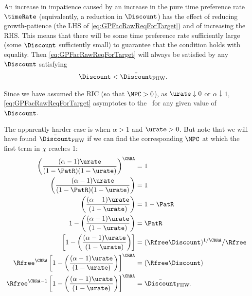 \documentclass{handout}
\begin{document}
An increase in impatience caused by an increase in the pure time preference rate $\timeRate$ (equivalently, a reduction in $\Discount$) has the effect of reducing growth-patience (the LHS of \eqref{eq:GPFacRawReqForTarget}) and of increasing the RHS.  This means that there will be some time preference rate sufficiently large (some $\Discount$ sufficiently small) to guarantee that the condition holds with equality.  Then \eqref{eq:GPFacRawReqForTarget} will always be satisfied by any $\Discount$ satisfying \providecommand{\DiscountMaxGICWhenFHWCTBSHolds}{\ensuremath{\bar{\Discount}_{\text{FHW}}}}
\begin{equation}\begin{gathered}\begin{aligned}
  \Discount & <  \DiscountMaxGICWhenFHWCTBSHolds \label{eq:DiscountMaxGICWhenFHWCTBSHolds}
.\end{aligned}\end{gathered}\end{equation}


Since we have assumed the RIC (so that $\MPCU > 0$), as $\urate \downarrow 0$ or $\alpha \downarrow 1$, \eqref{eq:GPFacRawReqForTarget} asymptotes to the \GICPGro~for any given value of $\Discount$.  

The apparently harder case is when $\alpha>1$ and $\urate > 0$.  But note that we will have found $\DiscountMaxGICWhenFHWCTBSHolds$ if we can find the corresponding $\MPCU$ at which the first term in $\chi$ reaches 1:
\begin{equation}\begin{gathered}\begin{aligned}
    \left(\frac{(\alpha-1)\urate}{(1-\PatR) (1-\urate)}\right)^{\CRRA} & =  1
\\  \left(\frac{(\alpha-1)\urate}{(1-\PatR) (1-\urate)}\right) & =  1
\\  \left(\frac{(\alpha-1)\urate}{ (1-\urate)}\right) & =  1-\PatR
\\  1-\left(\frac{(\alpha-1)\urate}{ (1-\urate)}\right) & =  \PatR
\\                  \left[1-\left(\frac{(\alpha-1)\urate}{ (1-\urate)}\right)\right] & =  (\Rfree \Discount)^{1/\CRRA}/\Rfree
\\  \Rfree^{\CRRA}  \left[1-\left(\frac{(\alpha-1)\urate}{ (1-\urate)}\right)\right]^{\CRRA} & =  (\Rfree \Discount)
\\  \Rfree^{\CRRA-1}\left[1-\left(\frac{(\alpha-1)\urate}{ (1-\urate)}\right)\right]^{\CRRA} & =  \DiscountMaxGICWhenFHWCTBSHolds \label{eq:DiscountMaxGICWhenFHWCTBSHoldsAndGICPGroIsExactlySatisfied}
.\end{aligned}\end{gathered}\end{equation}
\end{document}
